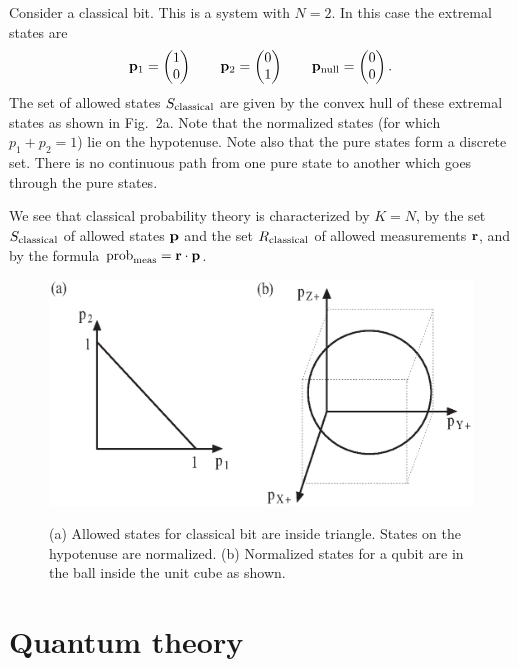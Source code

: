 \documentclass[10pt]{article}
\begin{document}
Consider a classical
bit. This is a system with $N=2$.  In this case the extremal states
are
\begin{equation}
{\bf p}_1= \left( \begin{matrix} 1 \\ 0 \end{matrix} \right) \qquad
{\bf p}_2= \left( \begin{matrix} 0 \\ 1 \end{matrix} \right) \qquad
{\bf p}_{\rm null}= \left( \begin{matrix} 0 \\ 0 \end{matrix} \right).
\end{equation}
The set of allowed states $S_{\rm classical}$ are given by the convex
hull of these extremal states as shown
in Fig.~2a. Note that the normalized states (for which $p_1+p_2=1$)
lie on the hypotenuse.  Note also that the pure states form a discrete
set.  There is no continuous path from one pure state to another which
goes through the pure states.

We see that classical probability theory is characterized by $K=N$, by the
set $S_{\rm classical}$ of allowed states ${\bf p}$ and the set
$R_{\rm classical}$ of allowed measurements ${\bf r}$,
and by the formula ${\rm prob}_{\rm meas}={\bf r}\cdot{\bf p}$.
\begin{figure}[t]
\resizebox{\textwidth}{!}
{\includegraphics{crakowf2.eps}}
\caption{\small (a) Allowed states for classical bit are inside triangle.
States on the hypotenuse are normalized.  (b) Normalized states for a
qubit are in the ball inside the unit cube as shown.}
\end{figure}



\section{Quantum theory}\label{quantumtheory}
\end{document}
